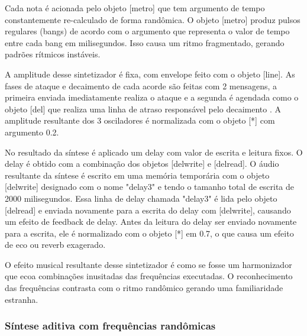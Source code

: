 \documentclass[draft]{ppgmus}
\begin{document}
Cada nota é acionada pelo objeto [metro] que tem argumento de tempo constantemente
re-calculado de forma randômica. O objeto [metro] produz pulsos regulares (bangs) de
acordo com o argumento que representa o valor de tempo entre cada bang em milisegundos.
Isso causa um ritmo fragmentado, gerando padrões rítmicos instáveis.

A amplitude desse sintetizador é fixa, com envelope feito com o
objeto [line\texttildelow]. As fases de ataque e decaimento de cada acorde 
são feitas com 2 mensagens, a primeira enviada imediatamente realiza o ataque 
e a segunda é agendada como o objeto [del] que realiza uma linha de atraso
responsável pelo decaimento . A amplitude resultante dos 3 osciladores é normalizada
com o objeto [*\texttildelow] com argumento 0.2.

No resultado da síntese é aplicado um delay com valor de escrita e leitura fixos.
O delay é obtido com a combinação dos objetos [delwrite\texttildelow] e 
[delread\texttildelow]. O áudio resultante da síntese é escrito em uma memória 
temporária com o objeto [delwrite\texttildelow] designado com o nome "delay3"
e tendo o tamanho total de escrita de 2000 milisegundos. Essa linha de delay
chamada "delay3" é lida pelo objeto [delread\texttildelow] e enviada
novamente para a escrita do delay com [delwrite\texttildelow], causando um
efeito de feedback de delay. Antes da leitura do delay ser enviado novamente
para a escrita, ele é normalizado com o objeto [*\texttildelow] em 0.7, o
que causa um efeito de eco ou reverb exagerado. 

O efeito musical resultante desse sintetizador é como se fosse um harmonizador que ecoa combinações inusitadas
das frequências executadas. O reconhecimento das frequências contrasta com o
ritmo randômico gerando uma familiaridade estranha.



\subsubsection{Síntese aditiva com frequências randômicas}
\end{document}
